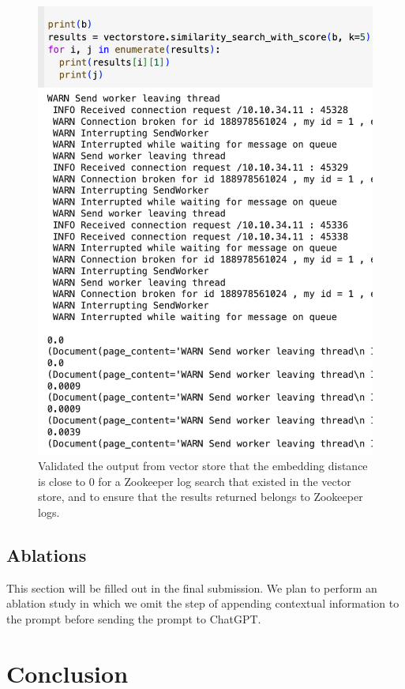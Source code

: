 \documentclass[conference]{IEEEtran}
\begin{document}
\begin{figure}
    \centering
    \includegraphics[width=0.8\linewidth]{Screen Shot 2023-11-19 at 9.03.00 PM.png}
    \caption{Validated the output from vector store that the embedding distance is close to 0 for a Zookeeper log search that existed in the vector store, and to ensure that the results returned belongs to Zookeeper logs.}
    \label{fig:redis-zookeeper}
\end{figure}

\subsection{Ablations}

This section will be filled out in the final submission. We plan to perform an ablation study in which we omit the step of appending contextual information to the prompt before sending the prompt to ChatGPT.

\section{Conclusion}

\end{document}
